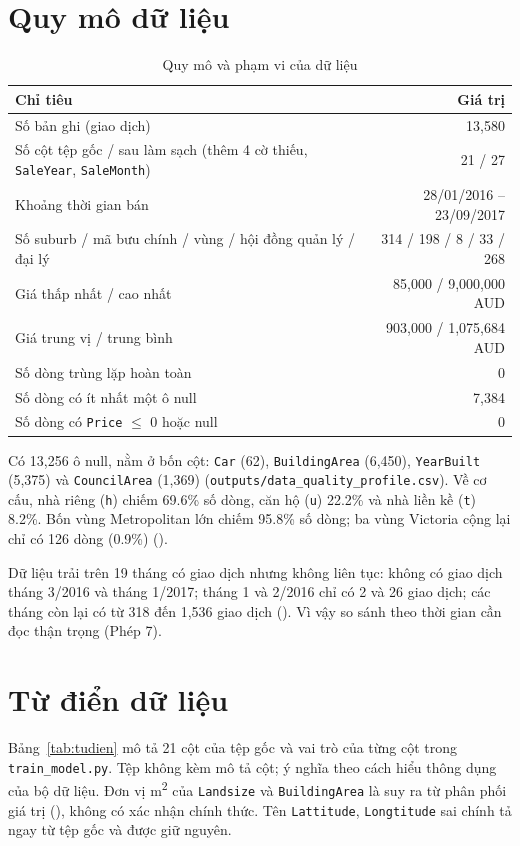 \section{Quy mô dữ liệu}\label{sec:quymo}
\begin{table}[H]
\centering
\caption{Quy mô và phạm vi của dữ liệu}\label{tab:quymo}
\small
\begin{tabular}{@{}l r@{}}
\toprule
Chỉ tiêu & Giá trị \\
\midrule
Số bản ghi (giao dịch) & 13,580 \\
Số cột tệp gốc / sau làm sạch (thêm 4 cờ thiếu, \texttt{SaleYear}, \texttt{SaleMonth}) & 21 / 27 \\
Khoảng thời gian bán & 28/01/2016 -- 23/09/2017 \\
Số suburb / mã bưu chính / vùng / hội đồng quản lý / đại lý & 314 / 198 / 8 / 33 / 268 \\
Giá thấp nhất / cao nhất & 85,000 / 9,000,000 AUD \\
Giá trung vị / trung bình & 903,000 / 1,075,684 AUD \\
Số dòng trùng lặp hoàn toàn & 0 \\
Số dòng có ít nhất một ô null & 7,384 \\
Số dòng có \texttt{Price} $\leq$ 0 hoặc null & 0 \\
\bottomrule
\end{tabular}
\end{table}

Có 13,256 ô null, nằm ở bốn cột: \texttt{Car} (62), \texttt{BuildingArea} (6,450), \texttt{YearBuilt} (5,375) và \texttt{CouncilArea} (1,369) (\texttt{outputs/data\_quality\_profile.csv}). Về cơ cấu, nhà riêng (\texttt{h}) chiếm 69.6\% số dòng, căn hộ (\texttt{u}) 22.2\% và nhà liền kề (\texttt{t}) 8.2\%. Bốn vùng Metropolitan lớn chiếm 95.8\% số dòng; ba vùng Victoria cộng lại chỉ có 126 dòng (0.9\%) ().

Dữ liệu trải trên 19 tháng có giao dịch nhưng không liên tục: không có giao dịch tháng 3/2016 và tháng 1/2017; tháng 1 và 2/2016 chỉ có 2 và 26 giao dịch; các tháng còn lại có từ 318 đến 1,536 giao dịch (). Vì vậy so sánh theo thời gian cần đọc thận trọng (Phép 7).

\section{Từ điển dữ liệu}\label{sec:tudien}
Bảng~\ref{tab:tudien} mô tả 21 cột của tệp gốc và vai trò của từng cột trong \texttt{train\_model.py}. Tệp không kèm mô tả cột; ý nghĩa theo cách hiểu thông dụng của bộ dữ liệu. Đơn vị m\textsuperscript{2} của \texttt{Landsize} và \texttt{BuildingArea} là suy ra từ phân phối giá trị (), không có xác nhận chính thức. Tên \texttt{Lattitude}, \texttt{Longtitude} sai chính tả ngay từ tệp gốc và được giữ nguyên.

